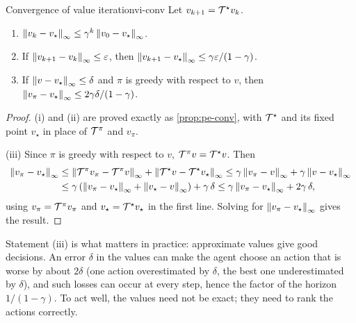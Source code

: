 \begin{theorem}{Convergence of value iteration}{vi-conv}
  Let $v_{k+1} = \mathcal{T}^\star v_k$.
  \begin{enumerate}[nosep, label=(\roman*)]
    \item $\left\lVert v_k - v_\star \right\rVert_\infty \leq \gamma^k \left\lVert v_0 -
      v_\star \right\rVert_\infty$.
    \item If $\left\lVert v_{k+1} - v_k \right\rVert_\infty \leq \varepsilon$, then
      $\left\lVert v_{k+1} - v_\star \right\rVert_\infty \leq \gamma \varepsilon / (1 -
      \gamma)$.
    \item If $\left\lVert v - v_\star \right\rVert_\infty \leq \delta$ and $\pi$ is greedy
      with respect to $v$, then $\left\lVert v_\pi - v_\star \right\rVert_\infty \leq 2
      \gamma \delta / (1 - \gamma)$.
  \end{enumerate}
\end{theorem}

\begin{proof}
  (i) and (ii) are proved exactly as \cref{prop:pe-conv}, with $\mathcal{T}^\star$
  and its fixed point $v_\star$ in place of $\mathcal{T}^\pi$ and $v_\pi$.

  (iii) Since $\pi$ is greedy with respect to $v$, $\mathcal{T}^\pi v = \mathcal{T}^\star v$.
  Then
  \begin{align*}
    \left\lVert v_\pi - v_\star \right\rVert_\infty
    &\leq \left\lVert \mathcal{T}^\pi v_\pi - \mathcal{T}^\pi v \right\rVert_\infty
      + \left\lVert \mathcal{T}^\star v - \mathcal{T}^\star v_\star \right\rVert_\infty
    \leq \gamma \left\lVert v_\pi - v \right\rVert_\infty + \gamma \left\lVert v - v_\star \right\rVert_\infty
    \\
    &\leq \gamma \left( \left\lVert v_\pi - v_\star \right\rVert_\infty
      + \left\lVert v_\star - v \right\rVert_\infty \right) + \gamma\, \delta
    \leq \gamma \left\lVert v_\pi - v_\star \right\rVert_\infty + 2 \gamma\, \delta,
  \end{align*}
  using $v_\pi = \mathcal{T}^\pi v_\pi$ and $v_\star = \mathcal{T}^\star v_\star$ in the first
  line. Solving for $\left\lVert v_\pi - v_\star \right\rVert_\infty$ gives the result.
\end{proof}

\begin{intuition}
  Statement (iii) is what matters in practice: approximate values give
  good decisions. An error $\delta$ in the values can make the agent choose
  an action that is worse by about $2 \delta$ (one action overestimated by
  $\delta$, the best one underestimated by $\delta$), and such losses can
  occur at every step, hence the factor of the horizon $1 / (1 - \gamma)$.
  To act well, the values need not be exact; they need to rank the actions
  correctly.
\end{intuition}

